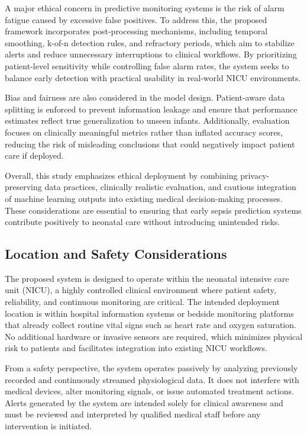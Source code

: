A major ethical concern in predictive monitoring systems is the risk of alarm fatigue caused by excessive false positives. To address this, the proposed framework incorporates post-processing mechanisms, including temporal smoothing, k-of-n detection rules, and refractory periods, which aim to stabilize alerts and reduce unnecessary interruptions to clinical workflows. By prioritizing patient-level sensitivity while controlling false alarm rates, the system seeks to balance early detection with practical usability in real-world NICU environments.

Bias and fairness are also considered in the model design. Patient-aware data splitting is enforced to prevent information leakage and ensure that performance estimates reflect true generalization to unseen infants. Additionally, evaluation focuses on clinically meaningful metrics rather than inflated accuracy scores, reducing the risk of misleading conclusions that could negatively impact patient care if deployed.

Overall, this study emphasizes ethical deployment by combining privacy-preserving data practices, clinically realistic evaluation, and cautious integration of machine learning outputs into existing medical decision-making processes. These considerations are essential to ensuring that early sepsis prediction systems contribute positively to neonatal care without introducing unintended risks.

\subsection{Location and Safety Considerations}

The proposed system is designed to operate within the neonatal intensive care unit (NICU), a highly controlled clinical environment where patient safety, reliability, and continuous monitoring are critical. The intended deployment location is within hospital information systems or bedside monitoring platforms that already collect routine vital signs such as heart rate and oxygen saturation. No additional hardware or invasive sensors are required, which minimizes physical risk to patients and facilitates integration into existing NICU workflows.

From a safety perspective, the system operates passively by analyzing previously recorded and continuously streamed physiological data. It does not interfere with medical devices, alter monitoring signals, or issue automated treatment actions. Alerts generated by the system are intended solely for clinical awareness and must be reviewed and interpreted by qualified medical staff before any intervention is initiated.

